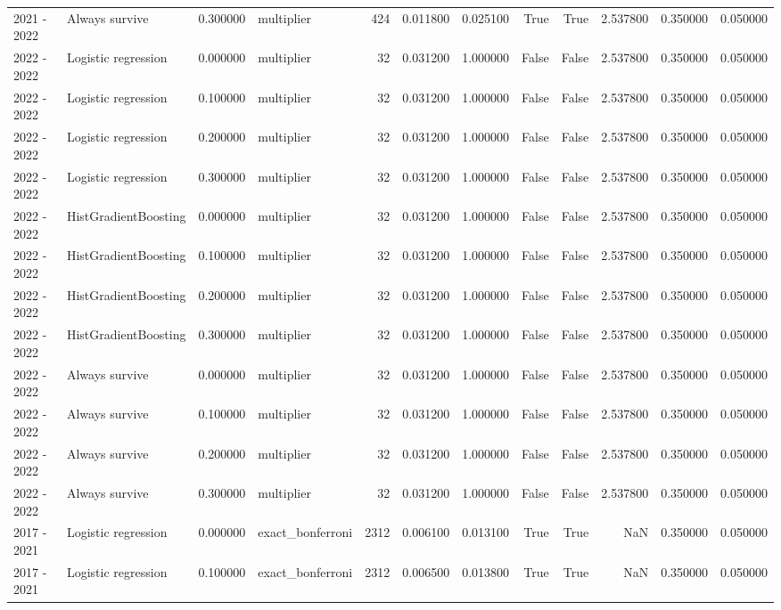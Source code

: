 \begin{tabular}{llrlrrrrrrrr}
2021 - 2022 & Always survive & 0.300000 & multiplier & 424 & 0.011800 & 0.025100 & True & True & 2.537800 & 0.350000 & 0.050000 \\
2022 - 2022 & Logistic regression & 0.000000 & multiplier & 32 & 0.031200 & 1.000000 & False & False & 2.537800 & 0.350000 & 0.050000 \\
2022 - 2022 & Logistic regression & 0.100000 & multiplier & 32 & 0.031200 & 1.000000 & False & False & 2.537800 & 0.350000 & 0.050000 \\
2022 - 2022 & Logistic regression & 0.200000 & multiplier & 32 & 0.031200 & 1.000000 & False & False & 2.537800 & 0.350000 & 0.050000 \\
2022 - 2022 & Logistic regression & 0.300000 & multiplier & 32 & 0.031200 & 1.000000 & False & False & 2.537800 & 0.350000 & 0.050000 \\
2022 - 2022 & HistGradientBoosting & 0.000000 & multiplier & 32 & 0.031200 & 1.000000 & False & False & 2.537800 & 0.350000 & 0.050000 \\
2022 - 2022 & HistGradientBoosting & 0.100000 & multiplier & 32 & 0.031200 & 1.000000 & False & False & 2.537800 & 0.350000 & 0.050000 \\
2022 - 2022 & HistGradientBoosting & 0.200000 & multiplier & 32 & 0.031200 & 1.000000 & False & False & 2.537800 & 0.350000 & 0.050000 \\
2022 - 2022 & HistGradientBoosting & 0.300000 & multiplier & 32 & 0.031200 & 1.000000 & False & False & 2.537800 & 0.350000 & 0.050000 \\
2022 - 2022 & Always survive & 0.000000 & multiplier & 32 & 0.031200 & 1.000000 & False & False & 2.537800 & 0.350000 & 0.050000 \\
2022 - 2022 & Always survive & 0.100000 & multiplier & 32 & 0.031200 & 1.000000 & False & False & 2.537800 & 0.350000 & 0.050000 \\
2022 - 2022 & Always survive & 0.200000 & multiplier & 32 & 0.031200 & 1.000000 & False & False & 2.537800 & 0.350000 & 0.050000 \\
2022 - 2022 & Always survive & 0.300000 & multiplier & 32 & 0.031200 & 1.000000 & False & False & 2.537800 & 0.350000 & 0.050000 \\
2017 - 2021 & Logistic regression & 0.000000 & exact_bonferroni & 2312 & 0.006100 & 0.013100 & True & True & NaN & 0.350000 & 0.050000 \\
2017 - 2021 & Logistic regression & 0.100000 & exact_bonferroni & 2312 & 0.006500 & 0.013800 & True & True & NaN & 0.350000 & 0.050000 \\

\end{tabular}
